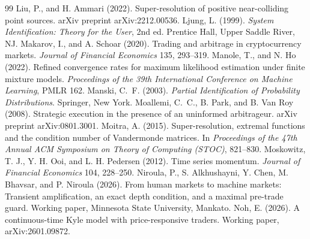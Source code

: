 \documentclass[12pt]{article}
\theoremstyle{definition}
\theoremstyle{remark}
\begin{document}
\begin{thebibliography}{99}
 Liu, P., and H. Ammari (2022). Super-resolution of positive near-colliding point sources. arXiv preprint arXiv:2212.00536.
 Ljung, L. (1999). \emph{System Identification: Theory for the User}, 2nd ed. Prentice Hall, Upper Saddle River, NJ.
 Makarov, I., and A. Schoar (2020). Trading and arbitrage in cryptocurrency markets. \emph{Journal of Financial Economics} 135, 293--319.
 Manole, T., and N. Ho (2022). Refined convergence rates for maximum likelihood estimation under finite mixture models. \emph{Proceedings of the 39th International Conference on Machine Learning}, PMLR 162.
 Manski, C.~F. (2003). \emph{Partial Identification of Probability Distributions}. Springer, New York.
 Moallemi, C.~C., B. Park, and B. Van Roy (2008). Strategic execution in the presence of an uninformed arbitrageur. arXiv preprint arXiv:0801.3001.
 Moitra, A. (2015). Super-resolution, extremal functions and the condition number of Vandermonde matrices. In \emph{Proceedings of the 47th Annual ACM Symposium on Theory of Computing (STOC)}, 821--830.
 Moskowitz, T. J., Y. H. Ooi, and L. H. Pedersen (2012). Time series momentum. \emph{Journal of Financial Economics} 104, 228--250.
 Niroula, P., S. Alkhushayni, Y. Chen, M. Bhavsar, and P. Niroula (2026). From human markets to machine markets: Transient amplification, an exact depth condition, and a maximal pre-trade guard. Working paper, Minnesota State University, Mankato.
 Noh, E. (2026). A continuous-time Kyle model with price-responsive traders. Working paper, arXiv:2601.09872.


\end{thebibliography}
\end{document}

